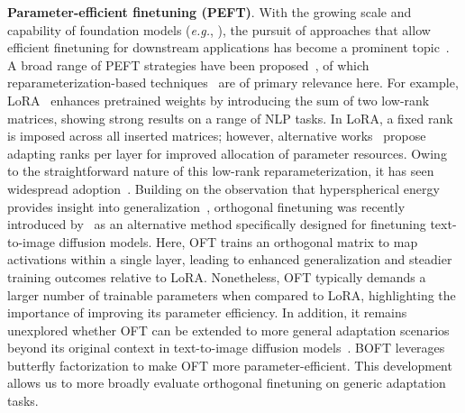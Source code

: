 \textbf{Parameter-efficient finetuning (PEFT)}. With the growing scale and capability of foundation models (\emph{e.g.}, \cite{brown2020language,radford2021learning,rombach2022high,kirillov2023segment}), the pursuit of approaches that allow efficient finetuning for downstream applications has become a prominent topic~\cite{treviso2023efficient,ding2023parameter,lialin2023scaling}. A broad range of PEFT strategies have been proposed~\cite{houlsby2019parameter,aghajanyan2020intrinsic,hulora2022,edalati2022krona,wang2022adamix,gheini2021cross,zaken2022bitfit,guo2020parameter,sung2021training,ansell2022composable,lester2021power,li2021prefix,vu2022spot,he2021towards,mao2021unipelt,karimi2021compacter,liu2022few,sung2022lst,chen2022parameter,jia2022visual,chen2022adaptformer,zhang2022neural,jie2023fact,lian2022scaling,luo2023towards}, of which reparameterization-based techniques~\cite{aghajanyan2020intrinsic,hulora2022,edalati2022krona} are of primary relevance here. For example, LoRA~\cite{hulora2022} enhances pretrained weights by introducing the sum of two low-rank matrices, showing strong results on a range of NLP tasks. In LoRA, a fixed rank is imposed across all inserted matrices; however, alternative works~\cite{zhang2022adaptive,valipour2022dylora,zhang2023increlora} propose adapting ranks per layer for improved allocation of parameter resources. Owing to the straightforward nature of this low-rank reparameterization, it has seen widespread adoption~\cite{dettmers2023qlora,zi2023delta,chavan2023one}. Building on the observation that hyperspherical energy provides insight into generalization~\cite{liu2018learning,liu2021orthogonal}, orthogonal finetuning was recently introduced by~\cite{qiu2023controlling} as an alternative method specifically designed for finetuning text-to-image diffusion models. Here, OFT trains an orthogonal matrix to map activations within a single layer, leading to enhanced generalization and steadier training outcomes relative to LoRA. Nonetheless, OFT typically demands a larger number of trainable parameters when compared to LoRA, highlighting the importance of improving its parameter efficiency. In addition, it remains unexplored whether OFT can be extended to more general adaptation scenarios beyond its original context in text-to-image diffusion models~\cite{qiu2023controlling}. BOFT leverages butterfly factorization to make OFT more parameter-efficient. This development allows us to more broadly evaluate orthogonal finetuning on generic adaptation tasks.

